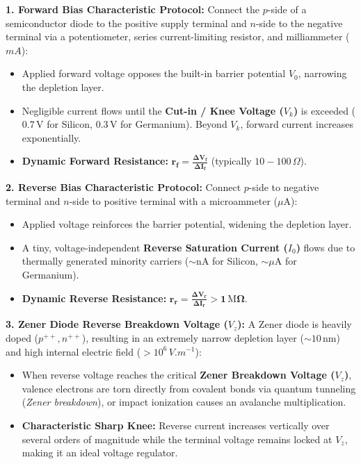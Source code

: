 \documentclass[10pt,twoside,openright]{book}
\begin{document}
\begin{conceptbox}
\textbf{1. Forward Bias Characteristic Protocol:}
Connect the $p$-side of a semiconductor diode to the positive supply terminal and $n$-side to the negative terminal via a potentiometer, series current-limiting resistor, and milliammeter ($\si{mA}$):
\begin{itemize}
  \item Applied forward voltage opposes the built-in barrier potential $V_0$, narrowing the depletion layer.
  \item Negligible current flows until the \textbf{Cut-in / Knee Voltage ($V_k$)} is exceeded ($\mathbf{0.7\,\mathrm{V}}$ for Silicon, $\mathbf{0.3\,\mathrm{V}}$ for Germanium). Beyond $V_k$, forward current increases exponentially.
  \item \textbf{Dynamic Forward Resistance:} $\mathbf{r_f = \frac{\Delta V_f}{\Delta I_f}}$ (typically $10-100\,\Omega$).
\end{itemize}
\textbf{2. Reverse Bias Characteristic Protocol:}
Connect $p$-side to negative terminal and $n$-side to positive terminal with a microammeter ($\mu\mathrm{A}$):
\begin{itemize}
  \item Applied voltage reinforces the barrier potential, widening the depletion layer.
  \item A tiny, voltage-independent \textbf{Reverse Saturation Current ($I_0$)} flows due to thermally generated minority carriers ($\sim \mathrm{nA}$ for Silicon, $\sim \mu\mathrm{A}$ for Germanium).
  \item \textbf{Dynamic Reverse Resistance:} $\mathbf{r_r = \frac{\Delta V_r}{\Delta I_r} > 1\,\mathrm{M}\Omega}$.
\end{itemize}
\textbf{3. Zener Diode Reverse Breakdown Voltage ($V_z$):}
A Zener diode is heavily doped ($p^{++}, n^{++}$), resulting in an extremely narrow depletion layer ($\sim 10\,\mathrm{nm}$) and high internal electric field ($> 10^6\,\si{V.m^{-1}}$):
\begin{itemize}
  \item When reverse voltage reaches the critical \textbf{Zener Breakdown Voltage ($V_z$)}, valence electrons are torn directly from covalent bonds via quantum tunneling (\textit{Zener breakdown}), or impact ionization causes an avalanche multiplication.
  \item \textbf{Characteristic Sharp Knee:} Reverse current increases vertically over several orders of magnitude while the terminal voltage remains locked at $V_z$, making it an ideal voltage regulator.
\end{itemize}
\end{conceptbox}
\end{document}

